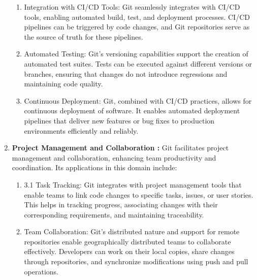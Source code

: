 \begin{enumerate}
\begin{enumerate}
        \item Integration with CI/CD Tools: Git seamlessly integrates with CI/CD tools, enabling automated build, test, and deployment processes. CI/CD pipelines can be triggered by code changes, and Git repositories serve as the source of truth for these pipelines.
        \item Automated Testing: Git's versioning capabilities support the creation of automated test suites. Tests can be executed against different versions or branches, ensuring that changes do not introduce regressions and maintaining code quality.
        \item Continuous Deployment: Git, combined with CI/CD practices, allows for continuous deployment of software. It enables automated deployment pipelines that deliver new features or bug fixes to production environments efficiently and reliably.
    \end{enumerate}
    \item \textbf{Project Management and Collaboration : }Git facilitates project management and collaboration, enhancing team productivity and coordination. Its applications in this domain include:
    \begin{enumerate}
        \item 3.1 Task Tracking: Git integrates with project management tools that enable teams to link code changes to specific tasks, issues, or user stories. This helps in tracking progress, associating changes with their corresponding requirements, and maintaining traceability.

        \item Team Collaboration: Git's distributed nature and support for remote repositories enable geographically distributed teams to collaborate effectively. Developers can work on their local copies, share changes through repositories, and synchronize modifications using push and pull operations.


\end{enumerate}
\end{enumerate}
